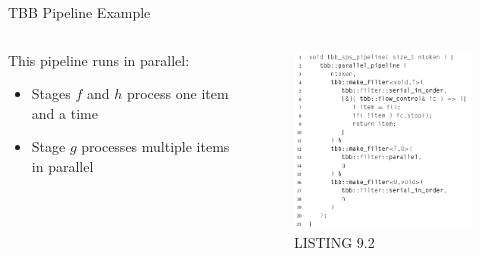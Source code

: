 \documentclass[xcolor=dvipsnames]{beamer}
\begin{document}
		
			\begin{frame}{TBB Pipeline Example}
				\begin{columns}
					\begin{column}{0.45\textwidth}
						This pipeline runs in parallel:
							\begin{itemize}
								\item Stages $f$ and $h$ process one item and a time
								\item Stage $g$ processes multiple items in parallel
							\end{itemize} 
					\end{column}
					\begin{column}{0.55\textwidth}
						\begin{figure}
							\vspace{-.4in} \includegraphics[width=2.65in]{images/parallelPipeline}
							\caption{LISTING 9.2}
						\end{figure} 
					\end{column}
				\end{columns}
			\end{frame}
		
		
\end{document}
